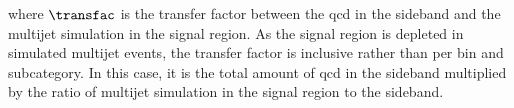 where $\transfac$ is the transfer factor between the \acrshort{qcd} in the sideband and the multijet simulation in the signal region. As the signal region is depleted in simulated multijet events, the transfer factor is inclusive rather than per \ptmiss bin and subcategory. In this case, it is the total amount of \acrshort{qcd} in the sideband multiplied by the ratio of multijet simulation in the signal region to the sideband.

